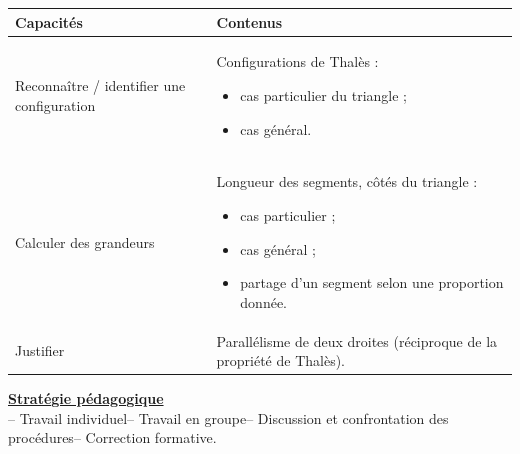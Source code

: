 \documentclass[10pt,a4paper]{article}
\begin{document}
\vspace{3pt}
\begin{tabularx}{\textwidth}{|P{0.38\textwidth}|Y|}\hline
{}\textcolor{rougefiche}{\bfseries\centering Capacités} & \textcolor{rougefiche}{\bfseries\centering Contenus}\\\hline
Reconnaître / identifier une configuration
& Configurations de Thalès :\begin{itemize}\item cas particulier du triangle ;\item cas général.\end{itemize}\\\hline
Calculer des grandeurs
& Longueur des segments, côtés du triangle :\begin{itemize}\item cas particulier ;\item cas général ;\item partage d'un segment selon une proportion donnée.\end{itemize}\\\hline
Justifier
& Parallélisme de deux droites (réciproque de la propriété de Thalès).\\\hline
\end{tabularx}

\vspace{3pt}
\textbf{\underline{Stratégie pédagogique}}\\[-2pt]
\hspace{7mm}-- Travail individuel\qquad -- Travail en groupe\qquad -- Discussion et confrontation des procédures\qquad -- Correction formative.
\end{document}

